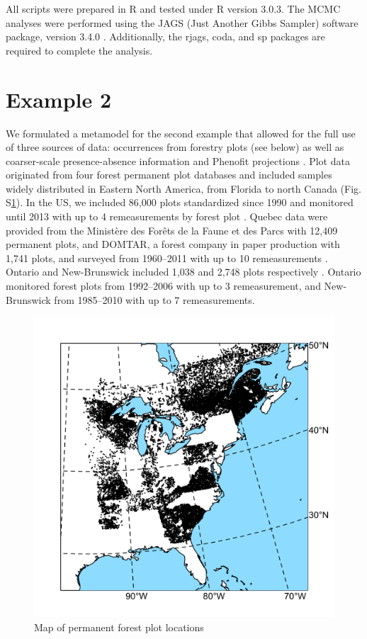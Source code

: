 \documentclass[11pt]{article}
\begin{document}
All scripts were prepared in R and tested under R version 3.0.3.
The MCMC analyses were performed using the JAGS (Just Another Gibbs Sampler) software package, version 3.4.0 \citep{RJAGS}.
Additionally, the rjags, coda, and sp packages are required to complete the analysis.

\section*{Example 2}
We formulated a metamodel for the second example that allowed for the full use of three sources of data: occurrences from forestry plots (see below) as well as coarser-scale presence-absence information and Phenofit projections \citep[both from][]{Morin2009}.
Plot data originated from four forest permanent plot databases and included samples widely distributed in Eastern North America, from Florida to north Canada (Fig. S\ref{fig:plotmap}).
In the US, we included 86,000 plots standardized since 1990 and monitored until 2013 with up to 4 remeasurements by forest plot \citep{OConnell2013}.
Quebec data were provided from the Ministère des Forêts de la Faune et des Parcs with 12,409 permanent plots, and DOMTAR, a forest company in paper production with 1,741 plots, and surveyed from 1960--2011 with up to 10 remeasurements \citep{MFFP2013}.
Ontario and New-Brunswick included 1,038 and 2,748 plots respectively \citep{Porter1999, Ontario2014}.
Ontario monitored forest plots from 1992--2006 with up to 3 remeasurement, and New-Brunswick from 1985--2010 with up to 7 remeasurements.

\begin{figure}
\includegraphics[width=4.5in]{figs/plotmap.png}
\caption{Map of permanent forest plot locations}
\label{fig:plotmap}
\end{figure}
\end{document}
